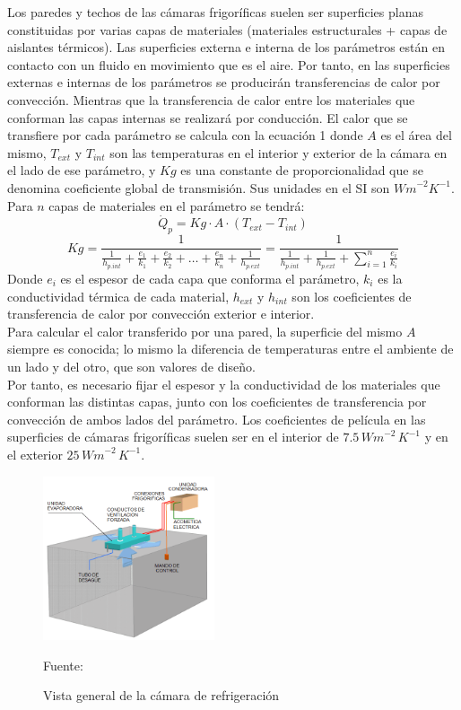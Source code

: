  Los paredes y techos de las cámaras frigoríficas suelen ser superficies planas constituidas por varias capas de materiales (materiales estructurales + capas de aislantes térmicos). Las superficies externa e interna de los parámetros están en contacto con un fluido en movimiento que es el aire. Por tanto, en las superficies externas e internas de los parámetros se producirán transferencias de calor por convección. Mientras que la transferencia de calor entre los materiales que conforman las capas internas se realizará por conducción. El calor que se transfiere por cada parámetro se calcula con la ecuación 1 donde $A$ es el área del mismo, $T_{ext}$ y $T_{int}$ son las temperaturas en el interior y exterior de la cámara en el lado de ese parámetro, y $Kg$ es una constante de proporcionalidad que se denomina coeficiente global de transmisión. Sus unidades en el SI son $  {W m}^{-2}  {K}^{-1} $. Para $n$ capas de materiales en el parámetro se tendrá:
 \begin{equation}
 	\dot{Q}_p = Kg \cdot A \cdot (T_{ext} - T_{int})
 \end{equation}
 \begin{equation}
 	Kg = \dfrac{1}{\frac{1}{h_{p.int}} + \frac{e_1}{k_1} + \frac{e_2}{k_2} + \dots + \frac{e_n}{k_n} + \frac{1}{h_{p.ext}}}  =\dfrac{1}{  \frac{1}{h_{p.int}} + \frac{1}{h_{p.ext}} +\sum_{i=1}^{n} \frac{e_i}{k_i}   }
 \end{equation}
 Donde $e_i$ es el espesor de cada capa que conforma el parámetro, $k_i$ es la conductividad térmica de cada material, $h_{ext}$ y $h_{int}$ son los coeficientes de transferencia de calor por convección exterior e interior.\\
  Para calcular el calor transferido por una pared, la superficie del mismo $A$ siempre es conocida; lo mismo la diferencia de temperaturas entre el ambiente de un lado y del otro, que son valores de diseño. \\
 Por tanto, es necesario fijar el espesor y la conductividad de los materiales que conforman las distintas capas, junto con los coeficientes de transferencia por convección de ambos lados del parámetro. Los coeficientes de película en las superficies de cámaras frigoríficas suelen ser en el interior de $7{.}5 \, {W m}^{-2} \, {K}^{-1}$ y en el exterior $25 \, {W m}^{-2} \, {K}^{-1}$.
 
 \begin{figure}[H]
 	\centering
 	\includegraphics[width=0.45\textwidth]{figures/paredes-refri.png}
 	\caption{Vista general de la cámara de refrigeración} Fuente: \cite{intarcon-2023}
 	\label{fig:paredes-refri}
 \end{figure}
 
